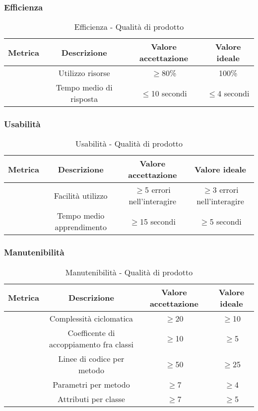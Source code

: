 \documentclass[11pt]{article}
\begin{document}
\begin{justify}
\subsubsection{Efficienza}
\begin{table}[H]
  \centering
\begin{tabular}{|c|c|c|c|}
  \hline
  \textbf{Metrica} & \textbf{Descrizione} & \textbf{Valore accettazione} & \textbf{Valore ideale}\\
  \hline
  & Utilizzo risorse & $\geq$80\% & 100\% \\
  \hline
  & Tempo medio di risposta & $\leq$10 secondi & $\leq$4 secondi \\
  \hline
\end{tabular}
\caption{Efficienza - Qualità di prodotto}
\label{tab:efficienza}
\end{table}

\subsubsection{Usabilità}
\begin{table}[H]
  \centering
\begin{tabular}{|c|c|c|c|}
  \hline
  \textbf{Metrica} & \textbf{Descrizione} & \textbf{Valore accettazione} & \textbf{Valore ideale}\\
  \hline
  & Facilità utilizzo & $\geq$5 errori nell'interagire & $\geq$3 errori nell'interagire  \\
  \hline
  & Tempo medio apprendimento & $\geq$15 secondi & $\geq$5 secondi \\
  \hline
\end{tabular}
\caption{Usabilità - Qualità di prodotto}
\label{tab:usabilità}
\end{table}

\subsubsection{Manutenibilità}
\begin{table}[H]
  \centering
\begin{tabular}{|c|c|c|c|}
  \hline
  \textbf{Metrica} & \textbf{Descrizione} & \textbf{Valore accettazione} & \textbf{Valore ideale}\\
  \hline
  & Complessità ciclomatica & $\geq$20 & $\geq$10 \\
  \hline
  & Coefficente di accoppiamento fra classi & $\geq$10 & $\geq$5 \\
  \hline
  & Linee di codice per metodo & $\geq$50 & $\geq$25 \\
  \hline
  & Parametri per metodo & $\geq$7 & $\geq$4 \\
  \hline
  & Attributi per classe & $\geq$7 & $\geq$5 \\
  \hline
\end{tabular}
\caption{Manutenibilità - Qualità di prodotto}
\label{tab:manutenibilità}
\end{table}


\end{justify}
\end{document}
